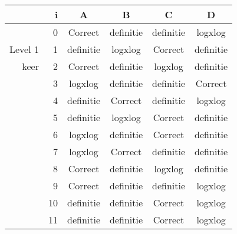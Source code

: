 \begin{tabular}{ rr| c|c|c|c}\hline\hline
     & i & \textbf{A} & \textbf{B} & \textbf{C} & \textbf{D}\\\hline

&0&Correct\cellcolor[gray]{0.6}&definitie&definitie&logxlog\\
Level 1 & 1&definitie&logxlog&Correct\cellcolor[gray]{0.6}&definitie\\
keer &2&Correct\cellcolor[gray]{0.6}&definitie&logxlog&definitie\\
&3&logxlog&definitie&definitie&Correct\cellcolor[gray]{0.6}\\
&4&definitie&Correct\cellcolor[gray]{0.6}&definitie&logxlog\\
&5&definitie&logxlog&Correct\cellcolor[gray]{0.6}&definitie\\
&6&logxlog&definitie&Correct\cellcolor[gray]{0.6}&definitie\\
&7&logxlog&Correct\cellcolor[gray]{0.6}&definitie&definitie\\
&8&Correct\cellcolor[gray]{0.6}&definitie&logxlog&definitie\\
&9&Correct\cellcolor[gray]{0.6}&definitie&definitie&logxlog\\
&10&definitie&definitie&Correct\cellcolor[gray]{0.6}&logxlog\\
&11&definitie&definitie&Correct\cellcolor[gray]{0.6}&logxlog\\
\hline\end{tabular}\par\ \newline

